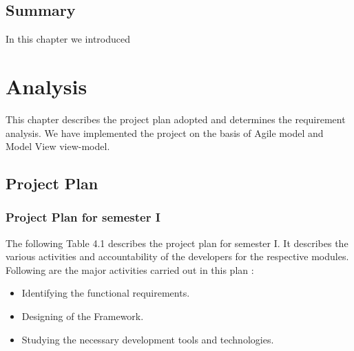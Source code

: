 \documentclass[openany,12pt]{report}
\begin{document}
\section{Summary}
\hspace*{0.5in}In this chapter we introduced

\chapter{Analysis}

\hspace*{0.5 in}This chapter describes the project plan adopted and determines the requirement analysis. We have implemented the project on the basis of Agile model and Model View view-model.


\section{Project Plan}

\subsection{Project Plan for semester I}

\hspace*{0.5 in}The following Table 4.1 describes the project plan for semester I. It describes the various activities and accountability of the developers for the respective modules. Following are the major activities carried out in this plan :
\begin{itemize}
\item{Identifying the functional requirements.}
\item{Designing of the Framework.}
\item{Studying the necessary development tools and technologies.}
\end{itemize}
\end{document}
